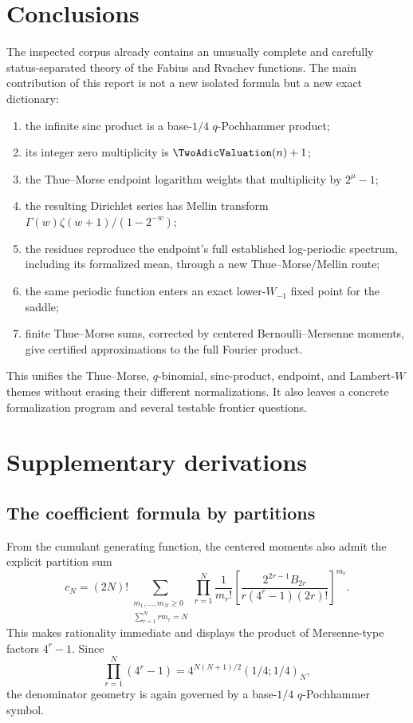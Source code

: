 \documentclass[11pt]{article}
\numberwithin{equation}{section}
\theoremstyle{definition}
\theoremstyle{remark}
\begin{document}
\section{Conclusions}
The inspected corpus already contains an unusually complete and carefully status-separated
theory of the Fabius and Rvachev functions.  The main contribution of this report is not a
new isolated formula but a new exact dictionary:
\begin{enumerate}
\item the infinite sinc product is a base-$1/4$ $q$-Pochhammer product;
\item its integer zero multiplicity is $\TwoAdicValuation(n)+1$;
\item the Thue--Morse endpoint logarithm weights that multiplicity by $2^\mu-1$;
\item the resulting Dirichlet series has Mellin transform
$\Gamma(w)\zeta(w+1)/(1-2^{-w})$;
\item the residues reproduce the endpoint's full established log-periodic spectrum,
including its formalized mean, through a new Thue--Morse/Mellin route;
\item the same periodic function enters an exact lower-$W_{-1}$ fixed point for the saddle;
\item finite Thue--Morse sums, corrected by centered Bernoulli--Mersenne moments, give
certified approximations to the full Fourier product.
\end{enumerate}
This unifies the Thue--Morse, $q$-binomial, sinc-product, endpoint, and Lambert-$W$ themes
without erasing their different normalizations.  It also leaves a concrete formalization
program and several testable frontier questions.

\appendix
\renewcommand*{\theHsection}{\arabic{part}.\arabic{section}}
\section{Supplementary derivations}

\subsection{The coefficient formula by partitions}
From the cumulant generating function, the centered moments also admit the explicit
partition sum
\begin{equation}
 c_N=(2N)!\!\sum_{\substack{m_1,\ldots,m_N\ge0\\
                    \sum_{r=1}^Nrm_r=N}}
 \prod_{r=1}^N\frac1{m_r!}
 \left[
  \frac{2^{2r-1}B_{2r}}{r(4^r-1)(2r)!}
 \right]^{m_r}.                                            \label{p9:eq:partition-moments}
\end{equation}
This makes rationality immediate and displays the product of Mersenne-type factors
$4^r-1$.  Since
\[
 \prod_{r=1}^N(4^r-1)=4^{N(N+1)/2}(1/4;1/4)_N,
\]
the denominator geometry is again governed by a base-$1/4$ $q$-Pochhammer symbol.
\end{document}
